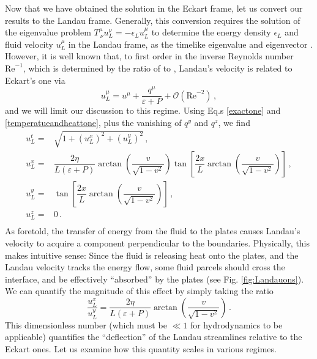 \documentclass[a4paper, amsfonts, amssymb, amsmath, reprint, showkeys, nofootinbib, twoside,notitlepage,onecolumn]{revtex4-1}
\theoremstyle{definition}
\theoremstyle{theorem}
\begin{document}
Now that we have obtained the solution in the Eckart frame, let us convert our results to the Landau frame. Generally, this conversion requires the solution of the eigenvalue problem
$T^{\mu}_{~\nu} u_{L}^{\nu} =- \epsilon_{L} u^{\mu}_{L}$ 
to determine the energy density $\epsilon_{L}$ and fluid velocity $u^{\mu}_{L}$ in the Landau frame, as the timelike eigenvalue and eigenvector \cite{landau6,OlsonLifsh1990}. However, it is well known that, to first order in the inverse Reynolds number $\text{Re}^{-1}$, which is determined by the ratio of  to , Landau's velocity is related to Eckart's one via \cite{Israel_Stewart_1979,GavassinoNonHydro2022}
\begin{equation}
u_L^\mu = u^\mu +\dfrac{q^\mu}{\varepsilon+P}+\mathcal{O}(\text{Re}^{-2})\, ,
\end{equation}
and we will limit our discussion to this regime.
Using Eq.s \eqref{exactone} and \eqref{temperatueandheattone}, plus the vanishing of $q^y$ and $q^z$, we find
\begin{equation}\label{landizia}
\begin{split}
u_L^t={}& \sqrt{1+(u_L^x)^2+(u_L^y)^2}\, , \\
u_L^x={}& \dfrac{2\eta}{L(\varepsilon{+}P)} \arctan\left(\dfrac{v}{\sqrt{1{-}v^2}}\right) \tan\left[ \dfrac{2x}{L} \arctan\left(\dfrac{v}{\sqrt{1{-}v^2}}\right)\right] \, , \\
u_L^y={}& \tan\left[\dfrac{2x}{L} \arctan\left(\dfrac{v}{\sqrt{1{-}v^2}} \right) \right] \, , \\
u_L^z={}& 0 \, . \\
\end{split}
\end{equation}
As foretold, the transfer of energy from the fluid to the plates causes Landau’s velocity to acquire a component perpendicular to the boundaries. Physically, this makes intuitive sense: Since the fluid is releasing heat onto the plates, and the Landau velocity tracks the energy flow, some fluid parcels should cross the interface, and be effectively ``absorbed'' by the plates (see Fig. \ref{fig:Landauons}). We can quantify the magnitude of this effect by simply taking the ratio
\begin{equation}\label{theSloope}
\dfrac{u_L^x}{u_L^y}=\dfrac{2\eta}{L(\varepsilon{+}P)} \arctan\left(\dfrac{v}{\sqrt{1{-}v^2}}\right)\, .
\end{equation}
This dimensionless number (which must be $\ll 1$ for hydrodynamics to be applicable) quantifies the ``deflection'' of the Landau streamlines relative to the Eckart ones. Let us examine how this quantity scales in various regimes. 
\end{document}
